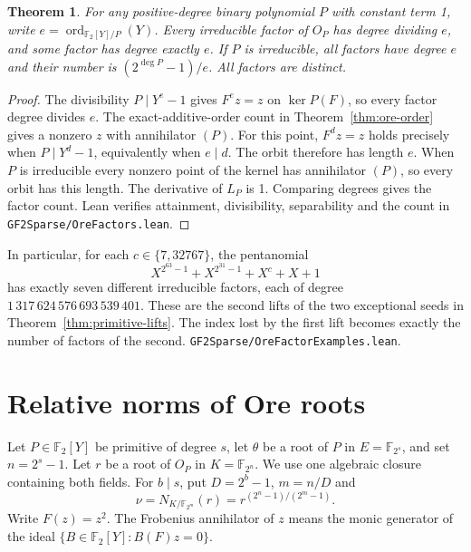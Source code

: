\documentclass[11pt]{article}
\newtheorem{theorem}{Theorem}
\newcommand{\F}{\mathbb F_2}
\newcommand{\ord}{\operatorname{ord}}
\begin{document}
\begin{theorem}\label{thm:ore-largest-factor}
For any positive-degree binary polynomial \(P\) with constant term 1,
write \(e=\ord_{\F[Y]/P}(Y)\). Every irreducible factor of \(O_P\)
has degree dividing \(e\), and some factor has degree exactly \(e\).
If \(P\) is irreducible, all factors have degree \(e\) and their
number is \((2^{\deg P}-1)/e\). All factors are distinct.
\end{theorem}
\begin{proof}
The divisibility \(P\mid Y^e-1\) gives \(F^e z=z\) on
\(\ker P(F)\), so every factor degree divides \(e\).
The exact-additive-order count in Theorem~\ref{thm:ore-order}
gives a nonzero \(z\) with annihilator \((P)\).
For this point, \(F^d z=z\) holds precisely when \(P\mid Y^d-1\),
equivalently when \(e\mid d\). The orbit therefore has length \(e\).
When \(P\) is irreducible every nonzero point of the kernel has
annihilator \((P)\), so every orbit has this length. The derivative
of \(L_P\) is 1. Comparing degrees gives the factor count.
Lean verifies attainment, divisibility, separability and the count
in \nolinkurl{GF2Sparse/OreFactors.lean}.
\end{proof}

In particular, for each \(c\in\{7,32767\}\), the pentanomial
\[
       X^{2^{63}-1}+X^{2^{31}-1}+X^c+X+1
\]
has exactly seven different irreducible factors, each of degree
\(1\,317\,624\,576\,693\,539\,401\). These are the second lifts of the
two exceptional seeds in Theorem~\ref{thm:primitive-lifts}. The index
lost by the first lift becomes exactly the number of factors of the
second. \nolinkurl{GF2Sparse/OreFactorExamples.lean}.


\section{Relative norms of Ore roots}\label{sec:ore-norms}

Let \(P\in\F[Y]\) be primitive of degree \(s\), let \(\theta\) be a root
of \(P\) in \(E=\mathbb F_{2^s}\), and set \(n=2^s-1\).
Let \(r\) be a root of \(O_P\) in \(K=\mathbb F_{2^n}\).
We use one algebraic closure containing both fields. For \(b\mid s\), put
\(D=2^b-1\), \(m=n/D\) and
\[
 \nu=N_{K/\mathbb F_{2^m}}(r)=r^{(2^n-1)/(2^m-1)} .
\]
Write \(F(z)=z^2\). The Frobenius annihilator of \(z\) means the
monic generator of the ideal \(\{B\in\F[Y]:B(F)z=0\}\).
\end{document}

